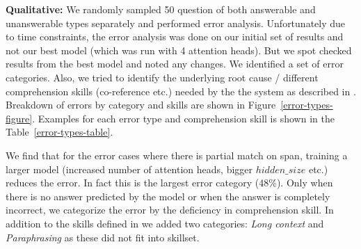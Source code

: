 \documentclass{article}
\begin{document}
\textbf{Qualitative:} We randomly sampled 50 question of both answerable and unanswerable types separately and performed error analysis. Unfortunately due to time constraints, the error analysis was done on our initial set of results and not our best model (which was run with 4 attention heads). But we spot checked results from the best model and noted any changes. We identified a set of error categories. Also, we tried to identify the underlying root cause / different comprehension skills (co-reference etc.) needed by the the system as described in \cite{sugawara2017evaluation}. Breakdown of errors by category and skills are shown in  Figure~\ref{error-types-figure}. Examples for each error type and comprehension skill is shown in the Table~\ref{error-types-table}. 

We find that for the error cases where there is partial match on span, training a larger model (increased number of attention heads, bigger $hidden\_size$ etc.) reduces the error. In fact this is the largest error category (48\%). Only when there is no answer predicted by the model or when the answer is completely incorrect, we categorize the error by the deficiency in comprehension skill. In addition to the skills defined in \cite{sugawara2017evaluation} we added two categories: \textit{Long context} and \textit{Paraphrasing} as these did not fit into skillset. 
\end{document}
